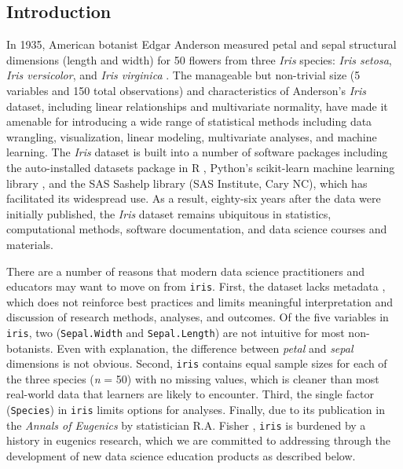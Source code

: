 \hypertarget{introduction}{%
\subsection{Introduction}\label{introduction}}

In 1935, American botanist Edgar Anderson measured petal and sepal
structural dimensions (length and width) for 50 flowers from three
\emph{Iris} species: \emph{Iris setosa}, \emph{Iris versicolor}, and
\emph{Iris virginica} \citep{anderson_irises_1935}. The manageable but
non-trivial size (5 variables and 150 total observations) and
characteristics of Anderson's \emph{Iris} dataset, including linear
relationships and multivariate normality, have made it amenable for
introducing a wide range of statistical methods including data
wrangling, visualization, linear modeling, multivariate analyses, and
machine learning. The \emph{Iris} dataset is built into a number of
software packages including the auto-installed datasets package in R
\citep[as \texttt{iris},][]{R-base}, Python's scikit-learn machine
learning library \citep{pedregosa_scikit-learn_2011}, and the SAS
Sashelp library (SAS Institute, Cary NC), which has facilitated its
widespread use. As a result, eighty-six years after the data were
initially published, the \emph{Iris} dataset remains ubiquitous in
statistics, computational methods, software documentation, and data
science courses and materials.

There are a number of reasons that modern data science practitioners and
educators may want to move on from \texttt{iris}. First, the dataset
lacks metadata \citep{anderson_irises_1935}, which does not reinforce
best practices and limits meaningful interpretation and discussion of
research methods, analyses, and outcomes. Of the five variables in
\texttt{iris}, two (\texttt{Sepal.Width} and \texttt{Sepal.Length}) are
not intuitive for most non-botanists. Even with explanation, the
difference between \emph{petal} and \emph{sepal} dimensions is not
obvious. Second, \texttt{iris} contains equal sample sizes for each of
the three species (\emph{n} = 50) with no missing values, which is
cleaner than most real-world data that learners are likely to encounter.
Third, the single factor (\texttt{Species}) in \texttt{iris} limits
options for analyses. Finally, due to its publication in the
\emph{Annals of Eugenics} by statistician R.A. Fisher
\citep{fisher_use_1936}, \texttt{iris} is burdened by a history in
eugenics research, which we are committed to addressing through the
development of new data science education products as described below.

